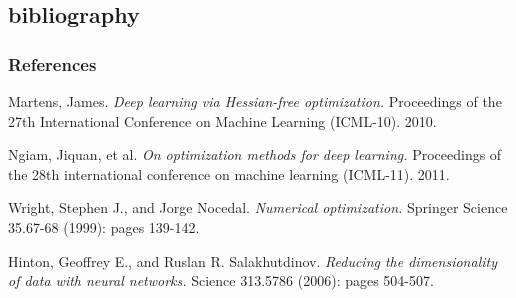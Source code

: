 \documentclass[professionalfont]{beamer}
\begin{document}
  \subsection{bibliography}
  \begin{frame}
    \frametitle{References}
    \begin{thebibliography}{9}
      Martens, James. \emph{Deep learning via Hessian-free optimization.}
      Proceedings of the 27th International Conference on Machine Learning (ICML-10). 2010.

      Ngiam, Jiquan, et al. \emph{On optimization methods for deep learning.}
      Proceedings of the 28th international conference on machine learning (ICML-11). 2011.

      Wright, Stephen J., and Jorge Nocedal.
      \emph{Numerical optimization.}
      Springer Science 35.67-68 (1999): pages 139-142.

    Hinton, Geoffrey E., and Ruslan R. Salakhutdinov.
    \emph{Reducing the dimensionality of data with neural networks.}
     Science 313.5786 (2006): pages 504-507.
    \end{thebibliography}
  \end{frame}
\end{document}

